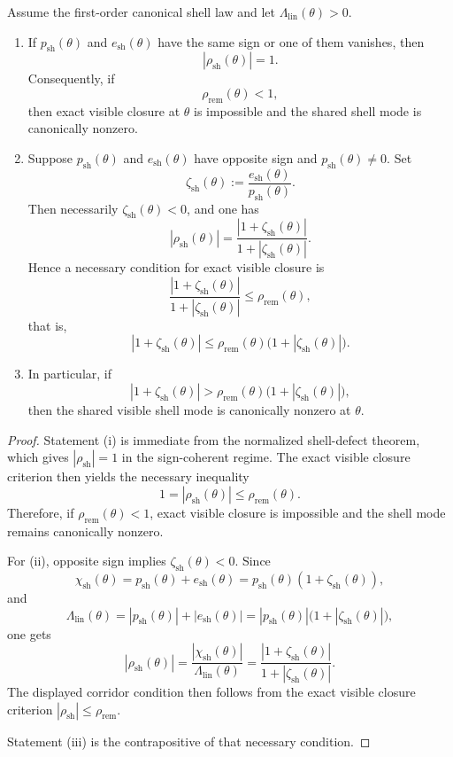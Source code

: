 \begin{theorem}
Assume the first-order canonical shell law and let $\Lambda_{\mathrm{lin}}(\theta)>0$.
\begin{enumerate}[leftmargin=2em,label=(\roman*)]
\item If $p_{\mathrm{sh}}(\theta)$ and $e_{\mathrm{sh}}(\theta)$ have the same sign or one of them vanishes, then
\[
  |\rho_{\mathrm{sh}}(\theta)|=1.
\]
Consequently, if
\[
  \rho_{\mathrm{rem}}(\theta)<1,
\]
then exact visible closure at $\theta$ is impossible and the shared shell mode is canonically nonzero.
\item Suppose $p_{\mathrm{sh}}(\theta)$ and $e_{\mathrm{sh}}(\theta)$ have opposite sign and $p_{\mathrm{sh}}(\theta)\neq 0$. Set
\[
  \zeta_{\mathrm{sh}}(\theta):=\frac{e_{\mathrm{sh}}(\theta)}{p_{\mathrm{sh}}(\theta)}.
\]
Then necessarily $\zeta_{\mathrm{sh}}(\theta)<0$, and one has
\[
  |\rho_{\mathrm{sh}}(\theta)|
  =\frac{|1+\zeta_{\mathrm{sh}}(\theta)|}{1+|\zeta_{\mathrm{sh}}(\theta)|}.
\]
Hence a necessary condition for exact visible closure is
\[
  \frac{|1+\zeta_{\mathrm{sh}}(\theta)|}{1+|\zeta_{\mathrm{sh}}(\theta)|}
  \le
  \rho_{\mathrm{rem}}(\theta),
\]
that is,
\[
  |1+\zeta_{\mathrm{sh}}(\theta)|
  \le
  \rho_{\mathrm{rem}}(\theta)\bigl(1+|\zeta_{\mathrm{sh}}(\theta)|\bigr).
\]
\item In particular, if
\[
  |1+\zeta_{\mathrm{sh}}(\theta)|
  >
  \rho_{\mathrm{rem}}(\theta)\bigl(1+|\zeta_{\mathrm{sh}}(\theta)|\bigr),
\]
then the shared visible shell mode is canonically nonzero at $\theta$.
\end{enumerate}
\end{theorem}

\begin{proof}
Statement (i) is immediate from the normalized shell-defect theorem, which gives $|\rho_{\mathrm{sh}}|=1$ in the sign-coherent regime. The exact visible closure criterion then yields the necessary inequality
\[
  1=|\rho_{\mathrm{sh}}(\theta)|\le \rho_{\mathrm{rem}}(\theta).
\]
Therefore, if $\rho_{\mathrm{rem}}(\theta)<1$, exact visible closure is impossible and the shell mode remains canonically nonzero.

For (ii), opposite sign implies $\zeta_{\mathrm{sh}}(\theta)<0$. Since
\[
  \chi_{\mathrm{sh}}(\theta)=p_{\mathrm{sh}}(\theta)+e_{\mathrm{sh}}(\theta)=p_{\mathrm{sh}}(\theta)(1+\zeta_{\mathrm{sh}}(\theta)),
\]
and
\[
  \Lambda_{\mathrm{lin}}(\theta)=|p_{\mathrm{sh}}(\theta)|+|e_{\mathrm{sh}}(\theta)|=|p_{\mathrm{sh}}(\theta)|\bigl(1+|\zeta_{\mathrm{sh}}(\theta)|\bigr),
\]
one gets
\[
  |\rho_{\mathrm{sh}}(\theta)|
  =\frac{|\chi_{\mathrm{sh}}(\theta)|}{\Lambda_{\mathrm{lin}}(\theta)}
  =\frac{|1+\zeta_{\mathrm{sh}}(\theta)|}{1+|\zeta_{\mathrm{sh}}(\theta)|}.
\]
The displayed corridor condition then follows from the exact visible closure criterion $|\rho_{\mathrm{sh}}|\le \rho_{\mathrm{rem}}$.

Statement (iii) is the contrapositive of that necessary condition.
\end{proof}

